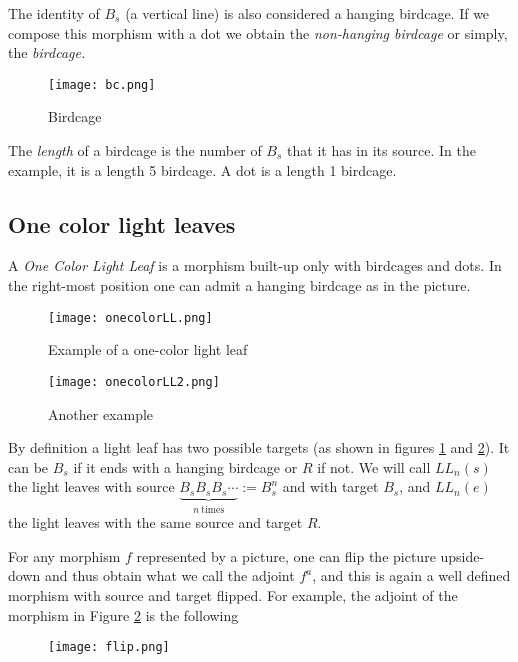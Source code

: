 \documentclass[12pt]{wart}
\theoremstyle{remark}
\begin{document}
The identity of $B_s$ (a vertical line) is also considered a hanging birdcage. 
If we compose this morphism with a dot we obtain the \emph{non-hanging birdcage} or simply, the \emph{birdcage.}
\begin{figure}[H] \begin{center}
 \texttt{[image: bc.png]} 
\end{center}
\caption{Birdcage}  
\end{figure} 
The \emph{length} of a birdcage is the number of $B_s$ that it has in its source. In the example, it is a length 5 birdcage. A dot is a length 1 birdcage. 

\subsection{One color light leaves}

A \emph{One Color Light Leaf} is a morphism built-up only with birdcages and dots. In the right-most position  one can admit  a hanging birdcage as in the picture. 


\begin{figure}[H] \begin{center}
 \texttt{[image: onecolorLL.png]} 
\end{center}
\caption{Example of a one-color light leaf}  
\label{LL1}
\end{figure} 


\begin{figure}[H] \begin{center}
 \texttt{[image: onecolorLL2.png]} 
\end{center}
\caption{Another example}  
\label{LL2}
\end{figure} 

By definition a light leaf has two possible targets (as shown in figures \ref{LL1} and  \ref{LL2}). It can be $B_s$ if it ends with a hanging birdcage or $R$ if not. We will call $LL_n(s)$ the light leaves with source  $\underbrace{B_sB_sB_s\cdots}_{n \ \mathrm{times}}:=B_{s}^n$ and with target $B_s$, and $LL_n(e)$ the light leaves with the same source and target $R$. 

For any morphism $f$ represented by a  picture, one can flip the picture upside-down and thus obtain what we call the adjoint $f^a$, and this is again a well defined morphism with source and target flipped. For example, the adjoint of the morphism in Figure \ref{LL2} is the following 
\begin{figure}[H] \begin{center}
 \texttt{[image: flip.png]} 
\end{center}
\end{figure} 
\end{document}
